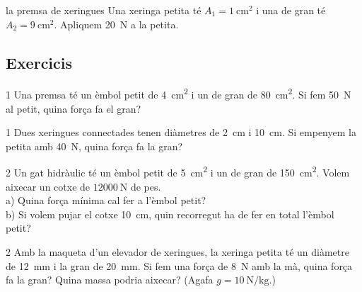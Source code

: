 \begin{guiada}{la premsa de xeringues}
Una xeringa petita té $A_1 = \SI{1}{\centi\meter\squared}$ i una de gran té $A_2 = \SI{9}{\centi\meter\squared}$. Apliquem \SI{20}{\newton} a la petita.
\end{guiada}

\subsection*{Exercicis}

\begin{exercici}{1}
Una premsa té un èmbol petit de \SI{4}{\centi\meter\squared} i un de gran de \SI{80}{\centi\meter\squared}. Si fem \SI{50}{\newton} al petit, quina força fa el gran?
\end{exercici}

\begin{exercici}{1}
Dues xeringues connectades tenen diàmetres de \SI{2}{\centi\meter} i \SI{10}{\centi\meter}. Si empenyem la petita amb \SI{40}{\newton}, quina força fa la gran?
\end{exercici}

\begin{exercici}{2}
Un gat hidràulic té un èmbol petit de \SI{5}{\centi\meter\squared} i un de gran de \SI{150}{\centi\meter\squared}. Volem aixecar un cotxe de $\SI{12000}{\newton}$ de pes.\\
a) Quina força mínima cal fer a l'èmbol petit?\\
b) Si volem pujar el cotxe \SI{10}{\centi\meter}, quin recorregut ha de fer en total l'èmbol petit?
\end{exercici}

\begin{exercici}{2}
Amb la maqueta d'un elevador de xeringues, la xeringa petita té un diàmetre de \SI{12}{\milli\meter} i la gran de \SI{20}{\milli\meter}. Si fem una força de \SI{8}{\newton} amb la mà, quina força fa la gran? Quina massa podria aixecar? (Agafa $g = \SI{10}{\newton\per\kilo\gram}$.)
\end{exercici}

